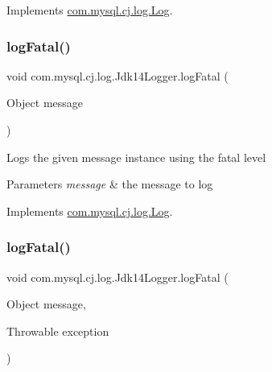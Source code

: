 Implements \mbox{\hyperlink{interfacecom_1_1mysql_1_1cj_1_1log_1_1_log_a96aab6e63a2ab9ebe3b640b7e253dd4f}{com.\+mysql.\+cj.\+log.\+Log}}.

\mbox{\label{classcom_1_1mysql_1_1cj_1_1log_1_1_jdk14_logger_a6f21dd8deaa592dba6d0dcdca158ad8e}} 
\subsubsection{\texorpdfstring{log\+Fatal()}{logFatal()}\hspace{0.1cm}{\footnotesize\ttfamily [1/2]}}
{\footnotesize\ttfamily void com.\+mysql.\+cj.\+log.\+Jdk14\+Logger.\+log\+Fatal (\begin{DoxyParamCaption}\item[{Object}]{message }\end{DoxyParamCaption})}

Logs the given message instance using the \textquotesingle{}fatal\textquotesingle{} level


\begin{DoxyParams}{Parameters}
{\em message} & the message to log \\
\hline
\end{DoxyParams}


Implements \mbox{\hyperlink{interfacecom_1_1mysql_1_1cj_1_1log_1_1_log_a4f36fdcde6b1c88a4f1ba25a70555e3f}{com.\+mysql.\+cj.\+log.\+Log}}.

\mbox{\label{classcom_1_1mysql_1_1cj_1_1log_1_1_jdk14_logger_a63cb086965547119c85338b7238594b9}} 
\subsubsection{\texorpdfstring{log\+Fatal()}{logFatal()}\hspace{0.1cm}{\footnotesize\ttfamily [2/2]}}
{\footnotesize\ttfamily void com.\+mysql.\+cj.\+log.\+Jdk14\+Logger.\+log\+Fatal (\begin{DoxyParamCaption}\item[{Object}]{message,  }\item[{Throwable}]{exception }\end{DoxyParamCaption})}

